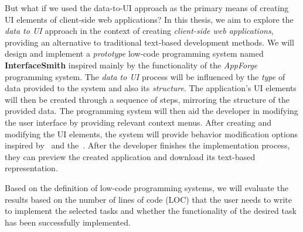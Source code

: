 But what if we used the data-to-UI approach as the primary means of creating UI elements of client-side web applications?
In this thesis, we aim to explore the \emph{data to UI} approach in the context of creating \emph{client-side web applications}, providing an alternative to traditional text-based development methods.
We will design and implement a \emph{prototype} low-code programming system named \textbf{InterfaceSmith} inspired mainly by the functionality of the \emph{AppForge} programming system.
The \emph{data to UI} process will be influenced by the \emph{type} of data provided to the system and also its \emph{structure}.
The application's UI elements will then be created through a sequence of steps, mirroring the structure of the provided data.
The programming system will then aid the developer in modifying the user interface by providing relevant context menus.
After creating and modifying the UI elements, the system will provide behavior modification options inspired by~\citet{elm} and the~\citet{elm-arch}.
After the developer finishes the implementation process, they can preview the created application and download its text-based representation.

Based on the definition of low-code programming systems, we will evaluate the results based on the number of lines of code (LOC) that the user needs to write to implement the selected tasks and whether the functionality of the desired task has been successfully implemented.

\medskip
